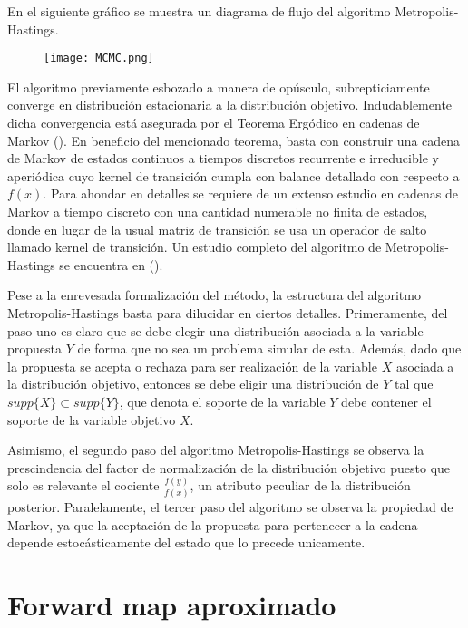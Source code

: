 En el siguiente gráfico se muestra un diagrama de flujo del algoritmo Metropolis-Hastings.

\begin{figure}[H] 
    \centering 
    \texttt{[image: MCMC.png]} 
    \label{Fig. M-H}
\end{figure} 

El algoritmo previamente esbozado a manera de opúsculo, subrepticiamente converge en distribución estacionaria a la distribución objetivo. Indudablemente dicha convergencia está asegurada por el Teorema Ergódico en cadenas de Markov (\cite{norris1998markov}). En beneficio del mencionado teorema, basta con construir una cadena de Markov de estados continuos a tiempos discretos recurrente e irreducible y aperiódica cuyo kernel de transición cumpla con balance detallado con respecto a $f(x)$. Para ahondar en detalles se requiere de un extenso estudio en cadenas de Markov a tiempo discreto con una cantidad numerable no finita de estados, donde en lugar de la usual matriz de transición se usa un operador de salto llamado kernel de transición. Un estudio completo del algoritmo de Metropolis-Hastings se encuentra en (\cite{mengersen1996rates}).

Pese a la enrevesada formalización del método, la estructura del algoritmo Metropolis-Hastings basta para dilucidar en ciertos detalles. Primeramente, del paso uno es claro que se debe elegir una distribución asociada a la variable propuesta $Y$ de forma que no sea un problema simular de esta. Además, dado que la propuesta se acepta o rechaza para ser realización de la variable $X$ asociada a la distribución objetivo, entonces se debe eligir una distribución de $Y$ tal que $supp\{X\} \subset supp\{Y\}$, que denota el soporte de la variable $Y$ debe contener el soporte de la variable objetivo $X$.

Asimismo, el segundo paso del algoritmo Metropolis-Hastings se observa la prescindencia del factor de normalización de la distribución objetivo puesto que solo es relevante el cociente $\frac{f(y)}{f(x)}$, un atributo peculiar de la distribución posterior. Paralelamente, el tercer paso del algoritmo se observa la propiedad de Markov, ya que la aceptación de la propuesta para pertenecer a la cadena depende estocásticamente del estado que lo precede unicamente.

\section{Forward map aproximado}

